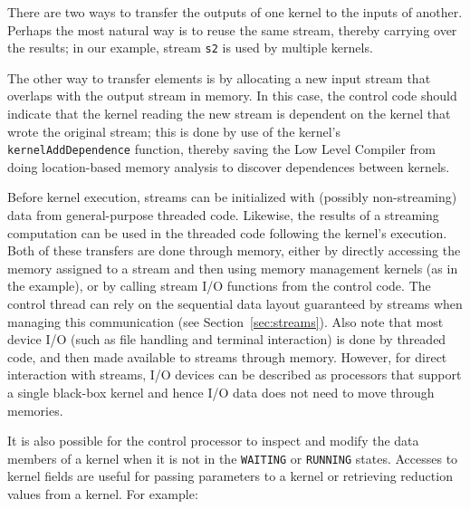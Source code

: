 
There are two ways to transfer the outputs of one kernel to the inputs
of another.  Perhaps the most natural way is to reuse the same stream,
thereby carrying over the results; in our example, stream {\tt s2} is
used by multiple kernels.

The other way to transfer elements is by allocating a new input stream
that overlaps with the output stream in memory.  In this case, the
control code should indicate that the kernel reading the new stream is
dependent on the kernel that wrote the original stream; this is done
by use of the kernel's {\tt kernelAddDependence} function, thereby
saving the Low Level Compiler from doing location-based memory
analysis to discover dependences between kernels.


Before kernel execution, streams can be initialized with (possibly
non-streaming) data from general-purpose threaded code.  Likewise, the
results of a streaming computation can be used in the threaded code
following the kernel's execution.  Both of these transfers are done
through memory, either by directly accessing the memory assigned to a
stream and then using memory management kernels (as in the example),
or by calling stream I/O functions from the control code.  The control
thread can rely on the sequential data layout guaranteed by streams
when managing this communication (see Section~\ref{sec:streams}).
Also note that most device I/O (such as file handling and terminal
interaction) is done by threaded code, and then made available to
streams through memory.  However, for direct interaction with streams,
I/O devices can be described as processors that support a single
black-box kernel and hence I/O data does not need to move through
memories.

It is also possible for the control processor to inspect and modify
the data members of a kernel when it is not in the {\tt WAITING} or
{\tt RUNNING} states. Accesses to kernel fields are useful for passing
parameters to a kernel or retrieving reduction values from a kernel.
For example:

